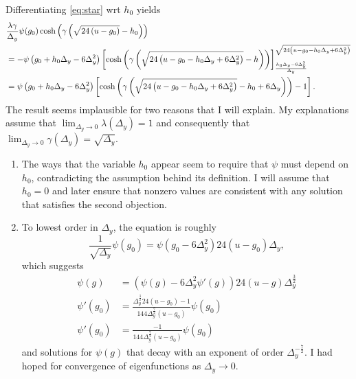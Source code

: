 \documentclass[]{article}
\begin{document}
\newpage

Differentiating \eqref{eq:star}  wrt $h_0$ yields
\newcommand{\temp}{g_0 + h_0 \Delta_y - 6 \Delta_y^2}
\newcommand{\mtemp}{-g_0 - h_0 \Delta_y + 6 \Delta_y^2}
\begin{align}
  & \frac{\lambda \gamma}{\Delta_y} \psi(g_0) \cosh \left( \gamma
    \left( \Rad{-g_0} - h_0 \right) \right) \nonumber \\
  &= - \psi\left( \temp \right)
  \left[ \cosh
    \left( \gamma
      \left( \Rad{\mtemp} - h \right)
    \right)
  \right]^{\Rad{\mtemp}}_ {\frac{h_0 \Delta_y - 6
      \Delta_y^2}{\Delta_y}} \nonumber \\
  \label{eq:DEG}
  &= \psi\left( \temp \right)
  \left[ \cosh
    \left( \gamma
      \left( \Rad{\mtemp} - h_0 + 6 \Delta_y \right)
    \right) -1
  \right].
\end{align}
The result seems implausible for two reasons that I will explain.  My
explanations assume that $\lim_{\Delta_y \rightarrow 0}
\lambda(\Delta_y) = 1$ and consequently that $\lim_{\Delta_y
  \rightarrow 0} \gamma(\Delta_y) = \sqrt{\Delta_y}$.
\begin{enumerate}
\item The ways that the variable $h_0$ appear seem to require that
  $\psi$ must depend on $h_0$, contradicting the assumption behind its
  definition.  I will assume that $h_0=0$ and later ensure that
  nonzero values are consistent with any solution that satisfies the
  second objection.
\item To lowest order in $\Delta_y$, the equation is roughly
  \begin{equation*}
    \frac{1}{\sqrt{\Delta_y}} \psi(g_0) = \psi(g_0 - 6\Delta_y^2)
    24(u-g_0) \Delta_y,
  \end{equation*}
  which suggests
  \begin{align*}
    \psi(g) &= \left( \psi(g) - 6\Delta_y^2 \psi'(g) \right) 24(u-g)
    \Delta_y^{\frac{3}{2}} \\
    \psi'(g_0) &= \frac{\Delta_y^{\frac{3}{2}} 24 (u-g_0) - 1} {144
      \Delta_y^{\frac{7}{2}} (u-g_0)} \psi(g_0) \\
    \psi'(g_0) &= \frac{- 1} {144 \Delta_y^{\frac{7}{2}} (u-g_0)} \psi(g_0)
  \end{align*}
  and solutions for $\psi(g)$ that decay with an exponent of order
  $\Delta_y^{ - \frac{7}{2}}$.  I had hoped for convergence of
  eigenfunctions as $\Delta_y \rightarrow 0$.
\end{enumerate}
\end{document}
